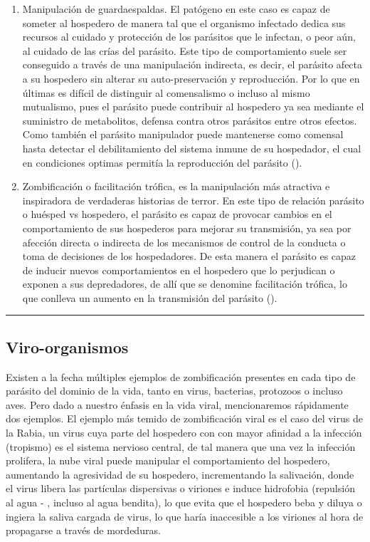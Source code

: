 \documentclass[
  12pt, krantz2,
  spanish,
]{krantz}
\begin{document}
\begin{enumerate}
\def\labelenumi{\arabic{enumi}.}
\item
  Manipulación de guardaespaldas. El patógeno en este caso es capaz de someter al hospedero de manera tal que el organismo infectado dedica sus recursos al cuidado y protección de los parásitos que le infectan, o peor aún, al cuidado de las crías del parásito. Este tipo de comportamiento suele ser conseguido a través de una manipulación indirecta, es decir, el parásito afecta a su hospedero sin alterar su auto-preservación y reproducción. Por lo que en últimas es difícil de distinguir al comensalismo o incluso al mismo mutualismo, pues el parásito puede contribuir al hospedero ya sea mediante el suministro de metabolitos, defensa contra otros parásitos entre otros efectos. Como también el parásito manipulador puede mantenerse como comensal hasta detectar el debilitamiento del sistema inmune de su hospedador, el cual en condiciones optimas permitía la reproducción del parásito (\citet{seppala2008host}).
\item
  Zombificación o facilitación trófica, es la manipulación más atractiva e inspiradora de verdaderas historias de terror. En este tipo de relación parásito o huésped vs hospedero, el parásito es capaz de provocar cambios en el comportamiento de sus hospederos para mejorar su transmisión, ya sea por afección directa o indirecta de los mecanismos de control de la conducta o toma de decisiones de los hospedadores. De esta manera el parásito es capaz de inducir nuevos comportamientos en el hospedero que lo perjudican o exponen a sus depredadores, de allí que se denomine facilitación trófica, lo que conlleva un aumento en la transmisión del parásito (\citet{seppala2008host}).
\end{enumerate}

\begin{center}\rule{0.5\linewidth}{0.5pt}\end{center}

\hypertarget{viro-organismos}{%
\subsection{Viro-organismos}\label{viro-organismos}}

Existen a la fecha múltiples ejemplos de zombificación presentes en cada tipo de parásito del dominio de la vida, tanto en virus, bacterias, protozoos o incluso aves. Pero dado a nuestro énfasis en la vida viral, mencionaremos rápidamente dos ejemplos. El ejemplo más temido de zombificación viral es el caso del virus de la Rabia, un virus cuya parte del hospedero con con mayor afinidad a la infección (tropismo) es el sistema nervioso central, de tal manera que una vez la infección prolifera, la nube viral puede manipular el comportamiento del hospedero, aumentando la agresividad de su hospedero, incrementando la salivación, donde el virus libera las partículas dispersivas o viriones e induce hidrofobia (repulsión al agua - \citet{wertheim2009furious}, incluso al agua bendita), lo que evita que el hospedero beba y diluya o ingiera la saliva cargada de virus, lo que haría inaccesible a los viriones al hora de propagarse a través de mordeduras.
\end{document}
